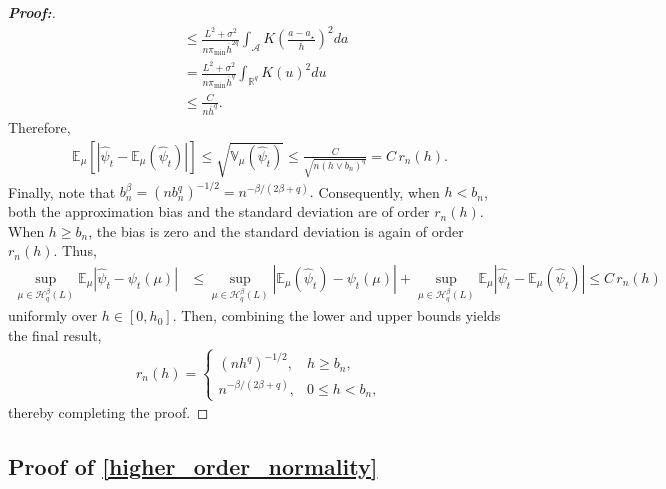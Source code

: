 \documentclass[11pt,twoside]{article}
\theoremstyle{definition}
\theoremstyle{remark}
\begin{document}
\begin{proof}[\textbf{Proof:}]
\begin{align*}
    &\leq \frac{L^2+\sigma^2}{n\pi_{\min}\overline{h}^{2q}} \int_{\mathcal{A}} K\!\left(\frac{a-a_\star}{\overline{h}} \right)^2 da \\
    &= \frac{L^2+\sigma^2}{n\pi_{\min}\overline{h}^q} \int_{\mathbb{R}^q}K(u)^2 du \\
    &\leq \frac{C}{n\overline{h}^q}.
\end{align*}
Therefore,
\begin{align*}
     \mathbb{E}_\mu \left[\left| \widehat\psi_t-\mathbb{E}_\mu(\widehat\psi_t) \right| \right] \leq \sqrt{ \mathbb{V}_\mu(\widehat\psi_t)} \leq \frac{C}{\sqrt{n(h\vee b_n)^q}} = C\,r_n(h).
\end{align*}
Finally, note that $b_n^\beta = (nb_n^q)^{-1/2} = n^{-\beta/(2\beta+q)}.$ Consequently, when $h<b_n$, both the approximation bias and the standard deviation are of order $r_n(h)$. When $h\geq b_n$, the bias is zero and the standard deviation is again of order $r_n(h)$. Thus,
\begin{align*}
    \sup_{\mu\in\mathcal{H}_q^\beta(L)} \mathbb{E}_\mu \left| \widehat\psi_t-\psi_t(\mu) \right| &\leq \sup_{\mu\in\mathcal{H}_q^\beta(L)} \left| \mathbb{E}_\mu(\widehat\psi_t)-\psi_t(\mu) \right| + \sup_{\mu\in\mathcal{H}_q^\beta(L)} \mathbb{E}_\mu \left| \widehat\psi_t-\mathbb{E}_\mu(\widehat\psi_t) \right| \leq C\,r_n(h)
\end{align*}
uniformly over $h\in[0,h_0]$. Then, combining the lower and upper bounds yields the final result,
\begin{align*}
        r_n(h) = \begin{cases}
        (nh^q)^{-1/2}, & h\geq b_n,\\[1mm]
        n^{-\beta/(2\beta+q)}, & 0\leq h<b_n,
    \end{cases}
\end{align*}
thereby completing the proof.

\end{proof}
\subsection{Proof of \cref{higher_order_normality}} \label{higher_order_normality_proof}
\end{document}
